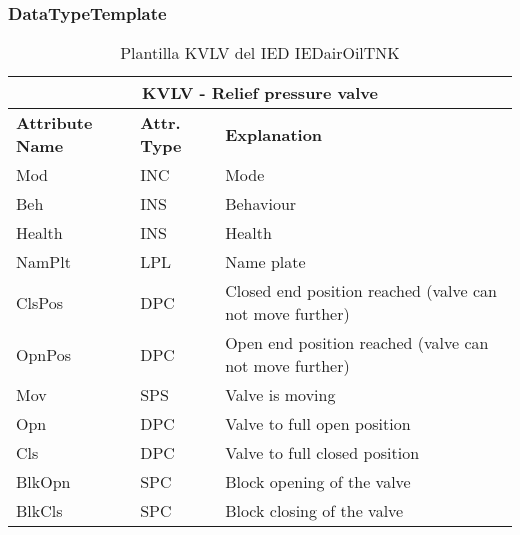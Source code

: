     \subsubsection{DataTypeTemplate}
    \begin{table}[H]
    \begin{center}
    \begin{tabular}{|l|l|p{8.5cm}|}
            \hline
            \multicolumn{3}{|c|}{\cellcolor[gray]{0.8} \textbf{ KVLV}  - Relief pressure valve} \\
            \hline
            \textbf{Attribute Name} & \textbf{Attr. Type} & \textbf{Explanation} \\
            \hline 
            Mod & INC & Mode \\
            \hline
            Beh & INS & Behaviour \\
            \hline
            Health & INS & Health \\
            \hline
            NamPlt & LPL & Name plate \\
            \hline
            ClsPos & DPC & Closed end position reached (valve can not move further) \\
            \hline
            OpnPos & DPC & Open end position reached (valve can not move further) \\
            \hline
            Mov & SPS & Valve is moving \\
            \hline
            Opn & DPC & Valve to full open position \\
            \hline
            Cls & DPC & Valve to full closed position \\
            \hline
            BlkOpn & SPC & Block opening of the valve \\
            \hline
            BlkCls & SPC & Block closing of the valve \\
            \hline
    \end{tabular}
    \caption{Plantilla KVLV del IED IEDairOilTNK}
    \label{table:lnTypeKVLV_relief}
    \end{center}
    \end{table}
    
    
    